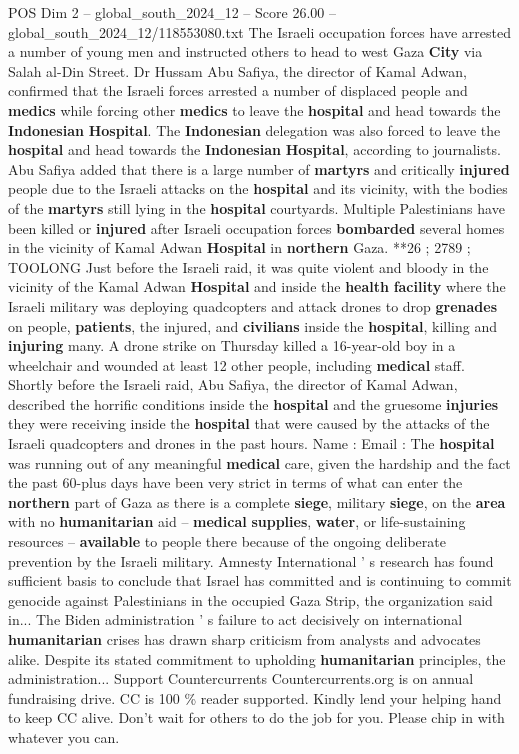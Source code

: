 \begin{textsample}{POS Dim 2 – global\_south\_2024\_12 – Score 26.00 – global\_south\_2024\_12/118553080.txt}
The Israeli occupation forces have arrested a number of young men and instructed others to head to west Gaza \textbf{City} via Salah al-Din Street.
Dr Hussam Abu Safiya, the director of Kamal Adwan, confirmed that the Israeli forces arrested a number of displaced people and \textbf{medics} while forcing other \textbf{medics} to leave the \textbf{hospital} and head towards the \textbf{Indonesian} \textbf{Hospital}.
The \textbf{Indonesian} delegation was also forced to leave the \textbf{hospital} and head towards the \textbf{Indonesian} \textbf{Hospital}, according to journalists.
Abu Safiya added that there is a large number of \textbf{martyrs} and critically \textbf{injured} people due to the Israeli attacks on the \textbf{hospital} and its vicinity, with the bodies of the \textbf{martyrs} still lying in the \textbf{hospital} courtyards.
Multiple Palestinians have been killed or \textbf{injured} after Israeli occupation forces \textbf{bombarded} several homes in the vicinity of Kamal Adwan \textbf{Hospital} in \textbf{northern} Gaza. **26 ; 2789 ; TOOLONG Just before the Israeli raid, it was quite violent and bloody in the vicinity of the Kamal Adwan \textbf{Hospital} and inside the \textbf{health} \textbf{facility} where the Israeli military was deploying quadcopters and attack drones to drop \textbf{grenades} on people, \textbf{patients}, the injured, and \textbf{civilians} inside the \textbf{hospital}, killing and \textbf{injuring} many.
A drone strike on Thursday killed a 16-year-old boy in a wheelchair and wounded at least 12 other people, including \textbf{medical} staff.
Shortly before the Israeli raid, Abu Safiya, the director of Kamal Adwan, described the horrific conditions inside the \textbf{hospital} and the gruesome \textbf{injuries} they were receiving inside the \textbf{hospital} that were caused by the attacks of the Israeli quadcopters and drones in the past hours.
Name : Email : The \textbf{hospital} was running out of any meaningful \textbf{medical} care, given the hardship and the fact the past 60-plus days have been very strict in terms of what can enter the \textbf{northern} part of Gaza as there is a complete \textbf{siege}, military \textbf{siege}, on the \textbf{area} with no \textbf{humanitarian} aid -- \textbf{medical} \textbf{supplies}, \textbf{water}, or life-sustaining resources -- \textbf{available} to people there because of the ongoing deliberate prevention by the Israeli military.
Amnesty International ' s research has found sufficient basis to conclude that Israel has committed and is continuing to commit genocide against Palestinians in the occupied Gaza Strip, the organization said in...
The Biden administration ' s failure to act decisively on international \textbf{humanitarian} crises has drawn sharp criticism from analysts and advocates alike.
Despite its stated commitment to upholding \textbf{humanitarian} principles, the administration...
Support Countercurrents Countercurrents.org is on annual fundraising drive.
CC is 100 \% reader supported.
Kindly lend your helping hand to keep CC alive.
Don't wait for others to do the job for you.
Please chip in with whatever you can.


\end{textsample}
